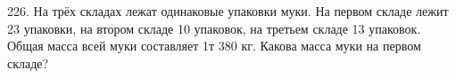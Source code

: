226. На трёх складах лежат одинаковые упаковки муки. На первом складе лежит 23 упаковки, на втором складе 10 упаковок, на третьем складе 13 упаковок. Общая масса всей муки составляет 1т 380 кг. Какова масса муки на первом складе?\\
